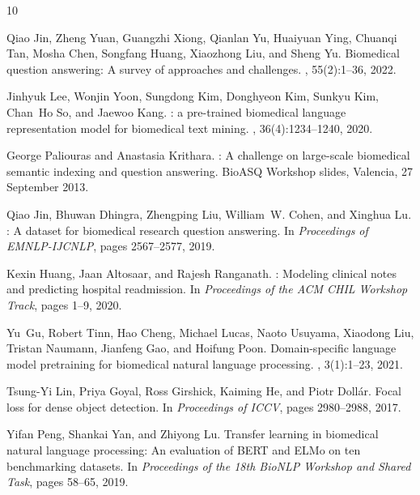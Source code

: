 \documentclass[11pt]{article}
\begin{document}
\begin{thebibliography}{10}

Qiao Jin, Zheng Yuan, Guangzhi Xiong, Qianlan Yu, Huaiyuan Ying, Chuanqi Tan, Mosha Chen, Songfang Huang, Xiaozhong Liu, and Sheng Yu.
\newblock Biomedical question answering: A survey of approaches and challenges.
, 55(2):1--36, 2022.

Jinhyuk Lee, Wonjin Yoon, Sungdong Kim, Donghyeon Kim, Sunkyu Kim, Chan~Ho So, and Jaewoo Kang.
: a pre-trained biomedical language representation model for biomedical text mining.
, 36(4):1234--1240, 2020.

George Paliouras and Anastasia Krithara.
: A challenge on large-scale biomedical semantic indexing and question answering.
\newblock BioASQ Workshop slides, Valencia, 27 September 2013.

Qiao Jin, Bhuwan Dhingra, Zhengping Liu, William~W. Cohen, and Xinghua Lu.
: A dataset for biomedical research question answering.
\newblock In {\em Proceedings of EMNLP-IJCNLP}, pages 2567--2577, 2019.

Kexin Huang, Jaan Altosaar, and Rajesh Ranganath.
: Modeling clinical notes and predicting hospital readmission.
\newblock In {\em Proceedings of the ACM CHIL Workshop Track}, pages 1--9, 2020.

Yu~Gu, Robert Tinn, Hao Cheng, Michael Lucas, Naoto Usuyama, Xiaodong Liu, Tristan Naumann, Jianfeng Gao, and Hoifung Poon.
\newblock Domain-specific language model pretraining for biomedical natural language processing.
, 3(1):1--23, 2021.

Tsung-Yi Lin, Priya Goyal, Ross Girshick, Kaiming He, and Piotr Doll{\'a}r.
\newblock Focal loss for dense object detection.
\newblock In {\em Proceedings of ICCV}, pages 2980--2988, 2017.

Yifan Peng, Shankai Yan, and Zhiyong Lu.
\newblock Transfer learning in biomedical natural language processing: An evaluation of {BERT} and {ELMo} on ten benchmarking datasets.
\newblock In {\em Proceedings of the 18th BioNLP Workshop and Shared Task}, pages 58--65, 2019.


\end{thebibliography}
\end{document}
